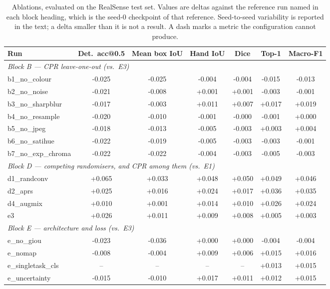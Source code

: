 \begin{table}[t]
\centering
\caption{Ablations, evaluated on the RealSense test set. Values are deltas against the reference run named in each block heading, which is the seed-0 checkpoint of that reference. Seed-to-seed variability is reported in the text; a delta smaller than it is not a result. A dash marks a metric the configuration cannot produce.}
\label{tab:ablation}
\begin{tabular}{lcccccc}
\toprule
Run & Det.\ acc@0.5 & Mean box IoU & Hand IoU & Dice & Top-1 & Macro-F1 \\
\midrule
\multicolumn{7}{l}{\textit{Block B --- CPR leave-one-out (vs.\ E3)}} \\
b1\_no\_colour & -0.025 & -0.025 & -0.004 & -0.004 & -0.015 & -0.013 \\
b2\_no\_noise & -0.021 & -0.008 & +0.001 & +0.001 & -0.003 & -0.001 \\
b3\_no\_sharpblur & -0.017 & -0.003 & +0.011 & +0.007 & +0.017 & +0.019 \\
b4\_no\_resample & -0.020 & -0.010 & -0.001 & -0.000 & -0.001 & +0.000 \\
b5\_no\_jpeg & -0.018 & -0.013 & -0.005 & -0.003 & +0.003 & +0.004 \\
b6\_no\_satihue & -0.022 & -0.019 & -0.005 & -0.003 & -0.003 & -0.001 \\
b7\_no\_exp\_chroma & -0.022 & -0.022 & -0.004 & -0.003 & -0.005 & -0.003 \\
\midrule
\multicolumn{7}{l}{\textit{Block D --- competing randomisers, and CPR among them (vs.\ E1)}} \\
d1\_randconv & +0.065 & +0.033 & +0.048 & +0.050 & +0.049 & +0.046 \\
d2\_aprs & +0.025 & +0.016 & +0.024 & +0.017 & +0.036 & +0.035 \\
d4\_augmix & +0.010 & +0.001 & +0.014 & +0.010 & +0.026 & +0.024 \\
e3 & +0.026 & +0.011 & +0.009 & +0.008 & +0.005 & +0.003 \\
\midrule
\multicolumn{7}{l}{\textit{Block E --- architecture and loss (vs.\ E3)}} \\
e\_no\_giou & -0.023 & -0.036 & +0.000 & +0.000 & -0.004 & -0.004 \\
e\_nomap & -0.008 & -0.004 & +0.009 & +0.006 & +0.015 & +0.016 \\
e\_singletask\_cls & -- & -- & -- & -- & +0.013 & +0.015 \\
e\_uncertainty & -0.015 & -0.010 & +0.017 & +0.011 & +0.012 & +0.015 \\

\end{tabular}
\end{table}

